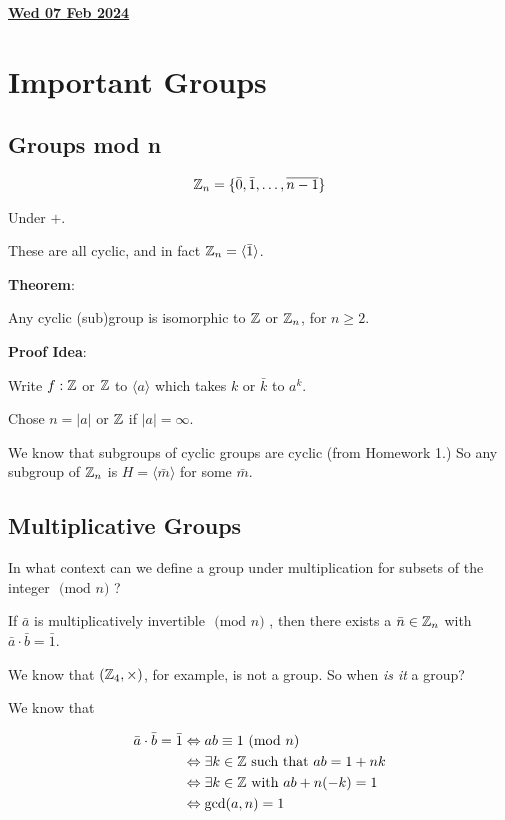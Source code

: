\documentclass[12pt]{article}
\renewcommand{\date}[1]{\newpage \underline{\bf #1}}
\newcommand{\lr}[1]{\langle #1 \rangle}
\renewcommand{\mod}[1]{
  \text{ (mod $#1$) }
}
\begin{document}
\date{Wed 07 Feb 2024}

\section{Important Groups}

\subsection{Groups mod n}

\[
	{\mathbb Z}_n = \{\bar 0, \bar 1, \dots, \overline{n - 1}\}
\]

Under $+$.

These are all cyclic, and in fact $\Z_n = \lr {\bar 1}$.

	{\bf Theorem}:

Any cyclic (sub)group is isomorphic to ${\mathbb Z}$ or ${\mathbb Z}_n$, for $n \ge 2$.

	{\bf Proof Idea}:

Write $f: {\mathbb Z}$ or ${\mathbb Z}$ to $\lr {a}$ which takes $k$ or $\bar k$ to $a^k$.

Chose $n = |a|$ or ${\mathbb Z}$ if $|a| = \infty$.

We know that subgroups of cyclic groups are cyclic (from Homework 1.) So any
subgroup of ${\mathbb Z}_n$ is $H = \lr{\bar m}$ for some $\bar m$.


\subsection{Multiplicative Groups}

In what context can we define a group under
multiplication for subsets of the integer $\mod n$?

If $\bar a$ is multiplicatively invertible $\mod n$, then there exists a
$\bar n \in {\mathbb Z}_n$ with $\bar a \cdot \bar b = \bar 1$.

We know that $({\mathbb Z}_4, \times)$, for example, is not a group. So when {\it is
		it} a group?

We know that

\begin{align*}
	\bar a \cdot \bar b = \bar 1 & \Leftrightarrow ab \equiv 1 \mod n           \\
	                             & \Leftrightarrow \exists k \in \Z \text{ such
	that } ab = 1 + nk                                                          \\
	                             & \Leftrightarrow \exists k \in \Z \text{
	with } ab + n(-k) = 1                                                       \\
	                             & \Leftrightarrow \gcd(a, n) = 1
\end{align*}
\end{document}
